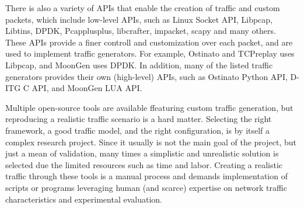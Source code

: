There is also a variety of APIs that enable the creation of traffic and custom packets, which include low-level APIs, such as Linux Socket API,  Libpcap, Libtins, DPDK, Pcapplusplus, libcrafter, impacket, scapy and many others. These APIs provide a finer controll and customization over each packet, and are used to implement traffic generators. For example, Ostinato and TCPreplay uses Libpcap, and MoonGen uses DPDK. In addition, many of the listed traffic generators provides their own (high-level) APIs, such as Ostinato Python API, D-ITG C API, and MoonGen LUA API. 





Multiple open-source tools are available ffeaturing custom traffic generation, but reproducing a realistic traffic scenario is a hard matter. Selecting the right framework, a good traffic model, and the right configuration, is by itself a complex research project\cite{legotg-paper}\cite{selfsimilar-ethernet}. Since it usually is not the main goal of the project, but just a mean of validation, many times a simplistic and unrealistic solution is selected due the limited resources such as time and labor.  Creating a realistic traffic through these tools is a manual process and demands implementation of scripts or programs leveraging human (and scarce) expertise on network traffic characteristics  and experimental evaluation. 


